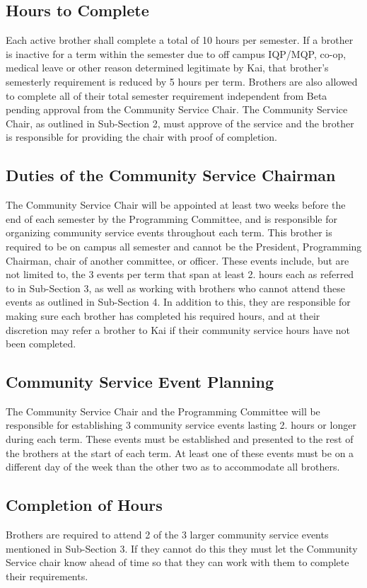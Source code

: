 \subsection{Hours to Complete}
Each active brother shall complete a total of 10 hours per semester.
If a brother is inactive for a term within the semester due to off campus IQP/MQP, co-op, medical leave or other reason determined legitimate by Kai, that brother’s semesterly requirement is reduced by 5 hours per term.
 Brothers are also allowed to complete all of their total semester requirement independent from Beta pending approval from the Community Service Chair.
The Community Service Chair, as outlined in Sub-Section 2, must approve of the service and the brother is responsible for providing the chair with proof of completion.

\subsection{Duties of the Community Service Chairman}
The Community Service Chair will be appointed at least two weeks before the end of each semester by the Programming Committee, and is responsible for organizing community service events throughout each term.
 This brother is required to be on campus all semester and cannot be the President, Programming Chairman, chair of another committee, or officer.
These events include, but are not limited to, the 3 events per term that span at least 2.
 hours each as referred to in Sub-Section 3, as well as working with brothers who cannot attend these events as outlined in Sub-Section 4.
 In addition to this, they are responsible for making sure each brother has completed his required hours, and at their discretion may refer a brother to Kai if their community service hours have not been completed.
\subsection{Community Service Event Planning}
The Community Service Chair and the Programming Committee will be responsible for establishing 3 community service events lasting 2.
 hours or longer during each term.
These events must be established and presented to the rest of the brothers at the start of each term.
At least one of these events must be on a different day of the week than the other two as to accommodate all brothers.

\subsection{Completion of Hours}
Brothers are required to attend 2 of the 3 larger community service events mentioned in Sub-Section 3.
If they cannot do this they must let the Community Service chair know ahead of time so that they can work with them to complete their requirements.

